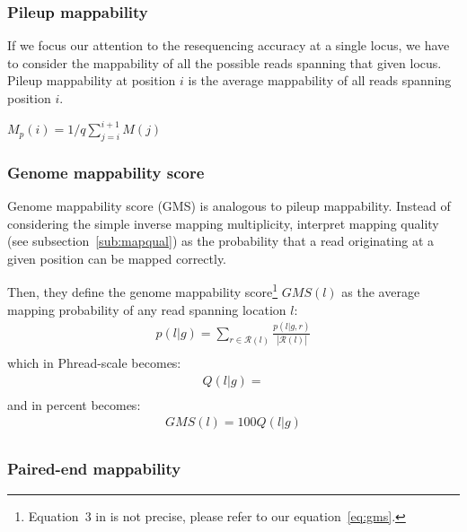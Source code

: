 \subsubsection{Pileup mappability}

If we focus our attention to the resequencing accuracy at a single locus, we have to consider the mappability of all the possible reads spanning that given locus.
Pileup mappability \citep{Derrien2012} at position $i$ is the average mappability of all reads spanning position $i$.

$M_p(i) = 1/q \sum_{j=i}^{i+1}{M(j)}$

\subsubsection{Genome mappability score}

Genome mappability score (GMS) \citep{Lee2012} is analogous to pileup mappability.
Instead of considering the simple inverse mapping multiplicity, \citeauthor{Lee2012} interpret mapping quality (see subsection~\ref{sub:mapqual}) as the probability that a read originating at a given position can be mapped correctly. %

Then, they define the genome mappability score\footnote{Equation~3 in \citep{Lee2012} is not precise, please refer to our equation~\ref{eq:gms}.} $GMS(l)$ as the average mapping probability of any read spanning location $l$:
\begin{eqnarray}
\label{eq:gms}
p(l|g) = \sum_{r \in \mathcal{R}(l)}{\frac{p(l|g,r)}{|\mathcal{R}(l)|}}\\
\end{eqnarray}
which in Phread-scale becomes:
\begin{eqnarray}
Q(l|g) = \\
\end{eqnarray}
and in percent becomes:
\begin{eqnarray}
GMS(l) = 100 Q(l|g)\\
\end{eqnarray}



\begin{center}

\end{center}

\subsubsection{Paired-end mappability}

